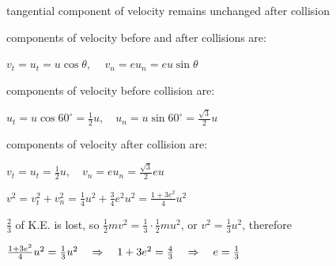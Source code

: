 tangential component of velocity remains unchanged after collision

components of velocity before and after collisions are: 

{

\centering

$v_t = u_t = u\cos\theta$, $\quad v_n = eu_n = eu \sin\theta$

}




components of velocity before collision are: 

{

\centering

$u_t = u\cos60^\circ = \frac{1}{2}u, \quad u_n = u\sin60^\circ = \frac{\sqrt{3}}{2}u$

}

components of velocity after collision are: 

{

\centering

$v_t = u_t = \frac{1}{2}u, \quad v_n = eu_n = \frac{\sqrt{3}}{2}eu$

$v^2 = v_t^2 + v_n^2 = \frac{1}{4}u^2 + \frac{3}{4}e^2u^2 = \frac{1+3e^2}{4}u^2$

}

$\frac{2}{3}$ of K.E. is lost, so $\frac{1}{2}mv^2 = \frac{1}{3} \cdot \frac{1}{2}mu^2$, or $v^2 = \frac{1}{3} u^2$, therefore

{
	
\centering
	
$\frac{1+3e^2}{4}u^2 = \frac{1}{3}u^2 \quad \Rightarrow \quad 1+3e^2 = \frac{4}{3} \quad \Rightarrow \quad e=\frac{1}{3}$ 
	
}
